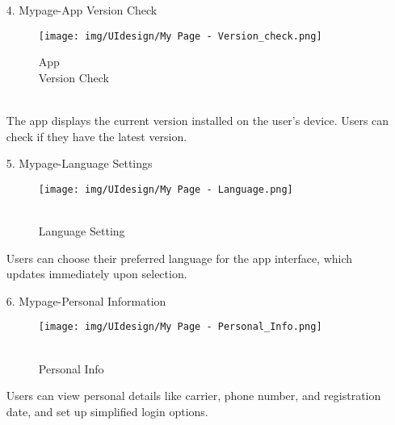 \documentclass[conference]{IEEEtran}
\begin{document}
\begin{enumerate}
    \item[4.] Mypage-App Version Check
    \begin{figure}[h]
\hspace{1.5cm}
\centering
\begin{minipage}{0.4\columnwidth}
    \texttt{[image: img/UIdesign/My Page - Version\_check.png]}
    \caption{App \\ Version Check}
\end{minipage}
\end{figure} \\
    The app displays the current version installed on the user's device. Users can check if they have the latest version. \\
\end{enumerate}

\begin{enumerate}
    \item[5.] Mypage-Language Settings
    \begin{figure}[h]
\hspace{1.5cm}
\centering
\begin{minipage}{0.4\columnwidth}
    \texttt{[image: img/UIdesign/My Page - Language.png]}
    \caption{\\ Language Setting}
\end{minipage}
\end{figure}

    Users can choose their preferred language for the app interface, which updates immediately upon selection. \\
\end{enumerate}

\begin{enumerate}
    \item[6.] Mypage-Personal Information
    \begin{figure}[h]
\hspace{1.5cm}
\centering
\begin{minipage}{0.4\columnwidth}
    \texttt{[image: img/UIdesign/My Page - Personal\_Info.png]}
    \caption{\\ Personal Info}
\end{minipage}
\end{figure}

    Users can view personal details like carrier, phone number, and registration date, and set up simplified login options. \\ \\ \\ \\ \\
\end{enumerate}
\end{document}
